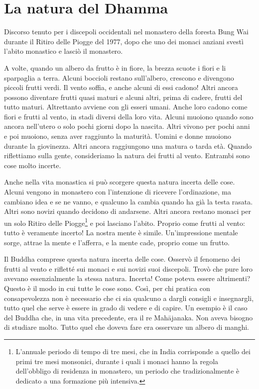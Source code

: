 \chapter{La natura del Dhamma}

\begin{openingQuote}
  \centering

  Discorso tenuto per i discepoli occidentali nel monastero della foresta Bung
  Wai durante il Ritiro delle Piogge del 1977, dopo che uno dei monaci anziani
  svestì l'abito monastico e lasciò il monastero.
\end{openingQuote}

A volte, quando un albero da frutto è in fiore, la brezza scuote i fiori
e li sparpaglia a terra. Alcuni boccioli restano sull'albero, crescono e
divengono piccoli frutti verdi. Il vento soffia, e anche alcuni di essi
cadono! Altri ancora possono diventare frutti quasi maturi e alcuni
altri, prima di cadere, frutti del tutto maturi. Altrettanto avviene con
gli esseri umani. Anche loro cadono come fiori e frutti al vento, in
stadi diversi della loro vita. Alcuni muoiono quando sono ancora
nell'utero o solo pochi giorni dopo la nascita. Altri vivono per pochi
anni e poi muoiono, senza aver raggiunto la maturità. Uomini e donne
muoiono durante la giovinezza. Altri ancora raggiungono una matura o
tarda età. Quando riflettiamo sulla gente, consideriamo la natura dei
frutti al vento. Entrambi sono cose molto incerte.

Anche nella vita monastica si può scorgere questa natura incerta delle
cose. Alcuni vengono in monastero con l'intenzione di ricevere
l'ordinazione, ma cambiano idea e se ne vanno, e qualcuno la cambia
quando ha già la testa rasata. Altri sono novizi quando decidono di
andarsene. Altri ancora restano monaci per un solo Ritiro delle
Piogge\footnote{L'annuale periodo di tempo di tre mesi, che in India
  corrisponde a quello dei primi tre mesi monsonici, durante i quali i
  monaci hanno la regola dell'obbligo di residenza in monastero, un
  periodo che tradizionalmente è dedicato a una formazione più
  intensiva.} e poi lasciano l'abito. Proprio come frutti al vento:
tutto è veramente incerto! La nostra mente è simile. Un'impressione
mentale sorge, attrae la mente e l'afferra, e la mente cade, proprio
come un frutto.

Il Buddha comprese questa natura incerta delle cose. Osservò il fenomeno
dei frutti al vento e rifletté sui monaci e sui novizi suoi discepoli.
Trovò che pure loro avevano essenzialmente la stessa natura. Incerta!
Come poteva essere altrimenti? Questo è il modo in cui tutte le cose
sono. Così, per chi pratica con consapevolezza non è necessario che ci
sia qualcuno a dargli consigli e insegnargli, tutto quel che serve è
essere in grado di vedere e di capire. Un esempio è il caso del Buddha
che, in una vita precedente, era il re Mahājanaka. Non aveva bisogno di
studiare molto. Tutto quel che doveva fare era osservare un albero di
manghi.

